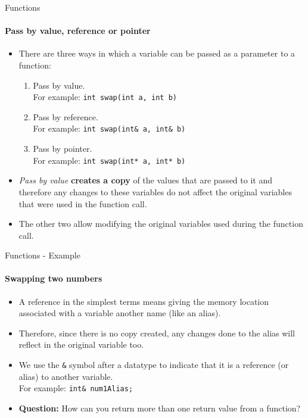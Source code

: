\documentclass[aspectratio=169]{beamer}
\begin{document}
\begin{frame}[fragile]{Functions}
    \framesubtitle{Pass by value, reference or pointer}
    \begin{itemize}
        \item There are three ways in which a variable can be passed as a parameter to a function:
        \begin{enumerate}
            \item Pass by value. \\For example: \verb|int swap(int a, int b)|
            \item Pass by reference. \\For example: \verb|int swap(int& a, int& b)|
            \item Pass by pointer. \\For example: \verb|int swap(int* a, int* b)|
        \end{enumerate}
        \item \textit{Pass by value} \textbf{creates a copy} of the values that are passed to it and therefore any changes to these variables do not affect the original variables that were used in the function call.
        \item The other two allow modifying the original variables used during the function call.
    \end{itemize}
\end{frame}

\begin{frame}[fragile]{Functions - Example}
    \framesubtitle{Swapping two numbers}
    \begin{itemize}
        \item A reference in the simplest terms means giving the memory location associated with a variable another name (like an alias).
        \item Therefore, since there is no copy created, any changes done to the alias will reflect in the original variable too.
        \item We use the \verb|&| symbol after a datatype to indicate that it is a reference (or alias) to another variable. \\For example: \verb|int& num1Alias;|
        \item \textbf{Question:} How can you return more than one return value from a function?
    \end{itemize}
\end{frame}
\end{document}
